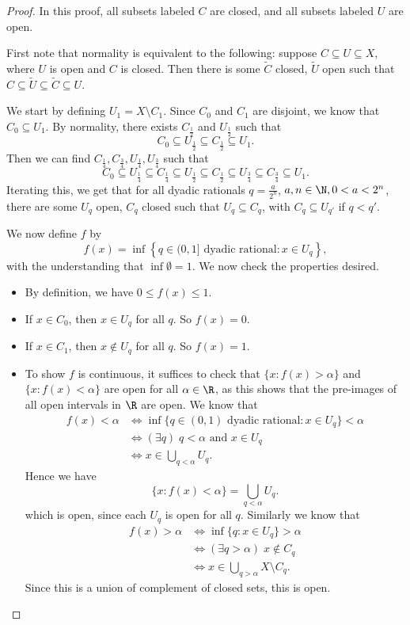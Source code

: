 \documentclass[a4paper]{article}
\begin{document}
\begin{proof}
  In this proof, all subsets labeled $C$ are closed, and all subsets labeled $U$ are open.

  First note that normality is equivalent to the following: suppose $C \subseteq U \subseteq X$, where $U$ is open and $C$ is closed. Then there is some $\tilde{C}$ closed, $\tilde{U}$ open such that $C\subseteq \tilde{U} \subseteq \tilde{C} \subseteq U$.

  We start by defining $U_1 = X \setminus C_1$. Since $C_0$ and $C_1$ are disjoint, we know that $C_0 \subseteq U_1$. By normality, there exists $C_{\frac{1}{2}}$ and $U_{\frac{1}{2}}$ such that
  \[
    C_0 \subseteq U_{\frac{1}{2}} \subseteq C_{\frac{1}{2}} \subseteq U_1.
  \]
  Then we can find $C_{\frac{1}{4}}, C_{\frac{3}{4}}, U_{\frac{1}{4}}, U_{\frac{3}{4}}$ such that
  \[
    C_0 \subseteq U_{\frac{1}{4}}\subseteq C_{\frac{1}{4}} \subseteq U_{\frac{1}{2}} \subseteq C_{\frac{1}{2}} \subseteq U_{\frac{3}{4}} \subseteq C_{\frac{3}{4}} \subseteq U_1.
  \]
  Iterating this, we get that for all dyadic rationals $q = \frac{a}{2^n}$, $a, n\in \N, 0 < a < 2^n$, there are some $U_q$ open, $C_q$ closed such that $U_q \subseteq C_q$, with $C_q \subseteq U_{q'}$ if $q < q'$.

  We now define $f$ by
  \[
  f(x) = \inf\left\{q \in (0, 1] \text{ dyadic rational}: x \in U_q\right\},
\]
with the understanding that $\inf \emptyset = 1$. We now check the properties desired.
\begin{itemize}
  \item By definition, we have $0 \leq f(x) \leq 1$.
  \item If $x \in C_0$, then $x \in U_q$ for all $q$. So $f(x) = 0$.
  \item If $x \in C_1$, then $x \not\in U_q$ for all $q$. So $f(x) = 1$.
  \item To show $f$ is continuous, it suffices to check that $\{x: f(x) > \alpha\}$ and $\{x: f(x) < \alpha\}$ are open for all $\alpha \in \R$, as this shows that the pre-images of all open intervals in $\R$ are open. We know that
    \begin{align*}
      f(x) < \alpha &\Leftrightarrow \inf\{q \in (0, 1)\text{ dyadic rational}: x \in U_q\} < \alpha \\
      &\Leftrightarrow (\exists q)\; q < \alpha \text{ and }x \in U_q\\
      &\Leftrightarrow x \in \bigcup_{q < \alpha} U_q.
    \end{align*}
    Hence we have
    \[
      \{x: f(x) < \alpha\} = \bigcup_{q < \alpha} U_q.
    \]
    which is open, since each $U_q$ is open for all $q$. Similarly we know that
    \begin{align*}
      f(x) > \alpha &\Leftrightarrow \inf\{q: x \in U_q\} > \alpha\\
      &\Leftrightarrow (\exists q > \alpha)\; x \not\in C_q\\
      &\Leftrightarrow x \in \bigcup_{q > \alpha} X \setminus C_q.
    \end{align*}
    Since this is a union of complement of closed sets, this is open.
\end{itemize}
\end{proof}
\end{document}

